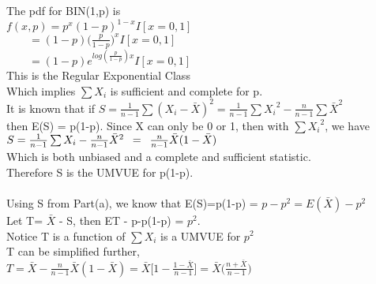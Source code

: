 
\\

\\

The pdf for BIN(1,p) is\\

$f(x,p)=p^{x}(1-p)^{1-x}I[x=0,1]$\\

$\quad \quad = (1-p) \Big( \frac{p}{1-p} \Big) ^{x} I[x=0,1]$\\

$\quad \quad = (1-p) e^{log(\frac{p}{1-p}) x} I[x=0,1]$\\

This is the Regular Exponential Class\\

Which implies $\sum{X_i}$ is sufficient and complete for p.\\

It is known that if $S= \frac{1}{n-1} \sum{(X_i - \bar{X})}^2 = \frac{1}{n-1}\sum{X_i}^2 - \frac{n}{n-1}\sum{\bar{X}}^2$\\

then E(S) = p(1-p). Since X can only be 0 or 1, then with $\sum{X_i}^2$, we have\\

$S=\frac{1}{n-1}\sum{X_i} - \frac{n}{n-1}\bar{X}^2 \enskip = \enskip \frac{n}{n-1} \bar{X}(1-\bar{X})$\\

Which is both unbiased and a complete and sufficient statistic.\\

Therefore S is the UMVUE for p(1-p).\\

\\

Using S from Part(a), we know that E(S)=p(1-p) = $p-p^2 = E(\bar{X}) - p^2$\\

Let T= $\bar{X}$ - S, then ET - p-p(1-p) = $p^2$.\\

Notice T is a function of $\sum{X_i}$ is a UMVUE for $p^2$\\

T can be simplified further,\\

$T=\bar{X} - \frac{n}{n-1}\bar{X}(1-\bar{X}) = \bar{X} \Big[ 1-\frac{1-\bar{X}}{n-1} \Big] = \bar{X} \Big( \frac{n+\bar{X}}{n-1}\Big)$\\
